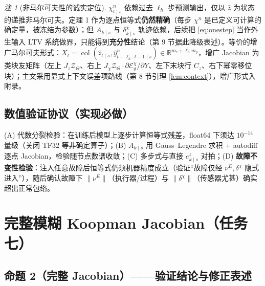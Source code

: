 \documentclass[11pt,a4paper]{ctexart}
\theoremstyle{remark}
\newtheorem{remark}{注}
\newcommand{\col}{\operatorname{col}}
\newcommand{\R}{\mathbb{R}}
\newcommand{\ZT}{\mathcal{Z}_{\Theta}}
\begin{document}
\begin{remark}[非马尔可夫性的诚实定位]\label{rem:nonmarkov}
$\chi^n_{t\mid s}$ 依赖过去 $\ell_h$ 步预测输出，仅以 $\hat z$ 为状态的递推非马尔可夫。定理 1 作为逐点恒等式\textbf{仍然精确}（每步 $\chi^n$ 是已定义可计算的确定量，被冻结为参数）；但 $A_{k\mid s}$ 与 $\delta^\chi_{k\mid s}$ 轨迹依赖，后续把 \eqref{eq:onestep} 当作外生输入 LTV 系统做界，只能得到\textbf{充分性}结论（第 9 节据此降级表述）。等价的增广马尔可夫形式：$X_t=\col(\hat z_{t\mid s},\hat y^n_{t-\ell_h:t-1\mid s})\in\R^{m_z+\ell_hm_y}$，增广 Jacobian 为类块友矩阵（左上 $J_z\ZT$、右上 $J_\chi\ZT\cdot\partial\mathcal E^\chi_\vartheta/\partial Y$、左下末块行 $C_z$、右下幂零移位块）；主文采用显式上下文误差项路线（第 8 节引理 \ref{lem:context}），增广形式入附录。
\end{remark}

\subsection{数值验证协议（实现必做）}

(A) 代数分裂检验：在训练后模型上逐步计算恒等式残差，float64 下须达 $10^{-14}$ 量级（关闭 TF32 等非确定算子）；(B) $A_{k\mid s}$ 用 Gauss--Legendre 求积 + autodiff 逐点 Jacobian，检验随节点数谱收敛；(C) 多步式与直接 $e^z_{k\mid s}$ 对拍；(D) \textbf{故障不变性检验}：注入任意故障后恒等式仍须机器精度成立（验证“故障仅经 $\nu^E,\delta^\chi$ 隐式进入”），随后确认故障下 $\|\nu^E\|$（执行器/过程）与 $\|\delta^\chi\|$（传感器尤甚）确实超出正常包络。

\section{完整模糊 Koopman Jacobian（任务七）}

\subsection{命题 2（完整 Jacobian）——验证结论与修正表述}
\end{document}
